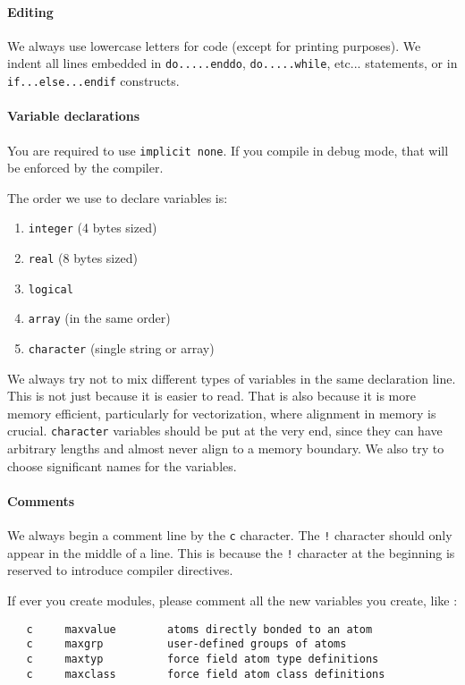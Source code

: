 \documentclass[peerreview]{IEEEtran}
\begin{document}
\paragraph{Editing}
We always use lowercase letters for code (except for printing purposes). We indent all lines embedded in \texttt{do.....enddo}, \texttt{do.....while}, etc...  statements, or in \texttt{if...else...endif} constructs. 
\paragraph{Variable declarations} You are required to use \texttt{implicit none}. If you compile in debug mode, that will be enforced by the compiler.

The order we use to declare variables is:
\begin{enumerate}
    \item \texttt{integer} (4 bytes sized)
    \item \texttt{real}    (8 bytes sized)
    \item \texttt{logical}
    \item \texttt{array} (in the same order)
    \item \texttt{character} (single string or array)
\end{enumerate}

We always try not to mix different types of variables in the same declaration line. This is not just because it is easier to read. That is also because it is more memory efficient, particularly for vectorization, where alignment in memory is crucial. \texttt{character} variables should be put at the very end, since they can have arbitrary lengths and almost never align to a memory boundary. We also try to choose significant names for the variables.

\paragraph{Comments} We always begin a comment line by the \texttt{c} character. The \texttt{!} character should only appear in the middle of a line.
This is because the \texttt{!} character at the beginning is reserved to introduce compiler directives.

If ever you create modules, please comment all the new variables you create, like :
\begin{verbatim}
   c     maxvalue        atoms directly bonded to an atom
   c     maxgrp          user-defined groups of atoms
   c     maxtyp          force field atom type definitions
   c     maxclass        force field atom class definitions
\end{verbatim}
\end{document}
